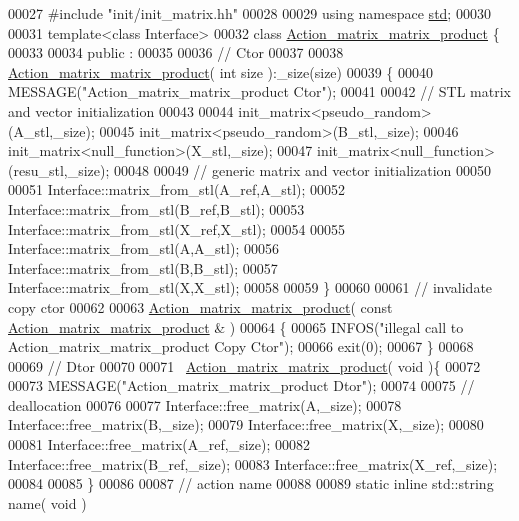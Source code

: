 \begin{DoxyCode}
00027 \textcolor{preprocessor}{#include "init/init\_matrix.hh"}
00028 
00029 \textcolor{keyword}{using namespace }\hyperlink{namespacestd}{std};
00030 
00031 \textcolor{keyword}{template}<\textcolor{keyword}{class} Interface>
00032 \textcolor{keyword}{class }\hyperlink{class_action__matrix__matrix__product}{Action\_matrix\_matrix\_product} \{
00033 
00034 public :
00035 
00036   \textcolor{comment}{// Ctor}
00037 
00038   \hyperlink{class_action__matrix__matrix__product}{Action\_matrix\_matrix\_product}( \textcolor{keywordtype}{int} size ):\_size(size)
00039   \{
00040     MESSAGE(\textcolor{stringliteral}{"Action\_matrix\_matrix\_product Ctor"});
00041 
00042     \textcolor{comment}{// STL matrix and vector initialization}
00043 
00044     init\_matrix<pseudo\_random>(A\_stl,\_size);
00045     init\_matrix<pseudo\_random>(B\_stl,\_size);
00046     init\_matrix<null\_function>(X\_stl,\_size);
00047     init\_matrix<null\_function>(resu\_stl,\_size);
00048 
00049     \textcolor{comment}{// generic matrix and vector initialization}
00050 
00051     Interface::matrix\_from\_stl(A\_ref,A\_stl);
00052     Interface::matrix\_from\_stl(B\_ref,B\_stl);
00053     Interface::matrix\_from\_stl(X\_ref,X\_stl);
00054 
00055     Interface::matrix\_from\_stl(A,A\_stl);
00056     Interface::matrix\_from\_stl(B,B\_stl);
00057     Interface::matrix\_from\_stl(X,X\_stl);
00058 
00059   \}
00060 
00061   \textcolor{comment}{// invalidate copy ctor}
00062 
00063   \hyperlink{class_action__matrix__matrix__product}{Action\_matrix\_matrix\_product}( \textcolor{keyword}{const}  
      \hyperlink{class_action__matrix__matrix__product}{Action\_matrix\_matrix\_product} & )
00064   \{
00065     INFOS(\textcolor{stringliteral}{"illegal call to Action\_matrix\_matrix\_product Copy Ctor"});
00066     exit(0);
00067   \}
00068 
00069   \textcolor{comment}{// Dtor}
00070 
00071   ~\hyperlink{class_action__matrix__matrix__product}{Action\_matrix\_matrix\_product}( \textcolor{keywordtype}{void} )\{
00072 
00073     MESSAGE(\textcolor{stringliteral}{"Action\_matrix\_matrix\_product Dtor"});
00074 
00075     \textcolor{comment}{// deallocation}
00076 
00077     Interface::free\_matrix(A,\_size);
00078     Interface::free\_matrix(B,\_size);
00079     Interface::free\_matrix(X,\_size);
00080 
00081     Interface::free\_matrix(A\_ref,\_size);
00082     Interface::free\_matrix(B\_ref,\_size);
00083     Interface::free\_matrix(X\_ref,\_size);
00084 
00085   \}
00086 
00087   \textcolor{comment}{// action name}
00088 
00089   \textcolor{keyword}{static} \textcolor{keyword}{inline} std::string name( \textcolor{keywordtype}{void} )

\end{DoxyCode}
